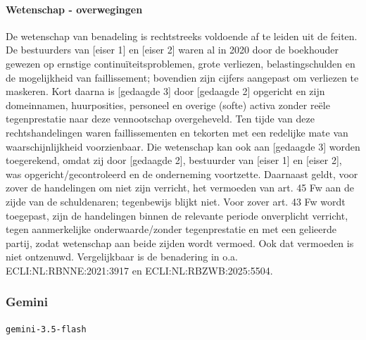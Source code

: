 \documentclass[
  dutch,
  a4paper,
]{article}
\begin{document}
\paragraph{Wetenschap - overwegingen}\label{wetenschap---overwegingen-22}

De wetenschap van benadeling is rechtstreeks voldoende af te leiden uit de feiten. De bestuurders van {[}eiser 1{]} en {[}eiser 2{]} waren al in 2020 door de boekhouder gewezen op ernstige continuïteitsproblemen, grote verliezen, belastingschulden en de mogelijkheid van faillissement; bovendien zijn cijfers aangepast om verliezen te maskeren. Kort daarna is {[}gedaagde 3{]} door {[}gedaagde 2{]} opgericht en zijn domeinnamen, huurposities, personeel en overige (softe) activa zonder reële tegenprestatie naar deze vennootschap overgeheveld. Ten tijde van deze rechtshandelingen waren faillissementen en tekorten met een redelijke mate van waarschijnlijkheid voorzienbaar. Die wetenschap kan ook aan {[}gedaagde 3{]} worden toegerekend, omdat zij door {[}gedaagde 2{]}, bestuurder van {[}eiser 1{]} en {[}eiser 2{]}, was opgericht/gecontroleerd en de onderneming voortzette. Daarnaast geldt, voor zover de handelingen om niet zijn verricht, het vermoeden van art. 45 Fw aan de zijde van de schuldenaren; tegenbewijs blijkt niet. Voor zover art. 43 Fw wordt toegepast, zijn de handelingen binnen de relevante periode onverplicht verricht, tegen aanmerkelijke onderwaarde/zonder tegenprestatie en met een gelieerde partij, zodat wetenschap aan beide zijden wordt vermoed. Ook dat vermoeden is niet ontzenuwd. Vergelijkbaar is de benadering in o.a. ECLI:NL:RBNNE:2021:3917 en ECLI:NL:RBZWB:2025:5504.

\newpage


\subsubsection{Gemini}\label{gemini-7}

\texttt{gemini-3.5-flash}
\end{document}

